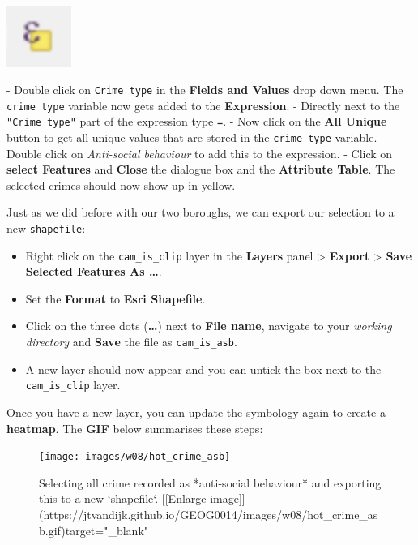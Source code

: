 \documentclass[
]{book}
\providecommand{\tightlist}{%
  \setlength{\itemsep}{0pt}\setlength{\parskip}{0pt}}
\begin{document}
\begin{center}\includegraphics[width=0.83in]{images/w08/select_exp} \end{center}

- Double click on \texttt{Crime\ type} in the \textbf{Fields and Values} drop down menu. The \texttt{crime\ type} variable now gets added to the \textbf{Expression}.
- Directly next to the \texttt{"Crime\ type"} part of the expression type \texttt{=}.
- Now click on the \textbf{All Unique} button to get all unique values that are stored in the \texttt{crime\ type} variable. Double click on \emph{Anti-social behaviour} to add this to the expression.
- Click on \textbf{select Features} and \textbf{Close} the dialogue box and the \textbf{Attribute Table}. The selected crimes should now show up in yellow.

Just as we did before with our two boroughs, we can export our selection to a new \texttt{shapefile}:

\begin{itemize}
\tightlist
\item
  Right click on the \texttt{cam\_is\_clip} layer in the \textbf{Layers} panel \textgreater{} \textbf{Export} \textgreater{} \textbf{Save Selected Features As \ldots{}}.
\item
  Set the \textbf{Format} to \textbf{Esri Shapefile}.
\item
  Click on the three dots (\textbf{\ldots{}}) next to \textbf{File name}, navigate to your \emph{working directory} and \textbf{Save} the file as \texttt{cam\_is\_asb}.
\item
  A new layer should now appear and you can untick the box next to the \texttt{cam\_is\_clip} layer.
\end{itemize}

Once you have a new layer, you can update the symbology again to create a \textbf{heatmap}. The \textbf{GIF} below summarises these steps:

\begin{figure}

{\centering \texttt{[image: images/w08/hot\_crime\_asb]} 

}

\caption{Selecting all crime recorded as *anti-social behaviour* and exporting this to a new `shapefile`. [[Enlarge image]](https://jtvandijk.github.io/GEOG0014/images/w08/hot_crime_asb.gif){target="_blank"}}\label{fig:hot-crime-asb}
\end{figure}
\end{document}
